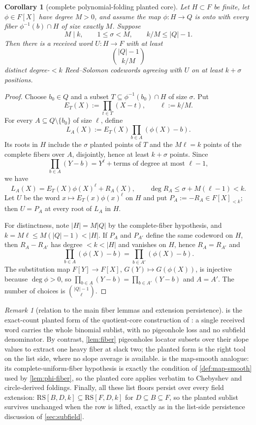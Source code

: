 \documentclass[11pt]{article}
\newtheorem{corollary}[corollary]{Corollary}
\theoremstyle{definition}
\theoremstyle{remark}
\newtheorem{remark}[remark]{Remark}
\newcommand{\RS}{\mathrm{RS}}
\begin{document}
\begin{corollary}[complete polynomial-folding planted core]\label{cor:capf-polyfold-planted}
Let $H\subset F$ be finite, let $\phi\in F[X]$ have degree $M>0$, and assume the map $\phi:H\to Q$ is onto with every fiber $\phi^{-1}(b)\cap H$ of size exactly $M$.  Suppose
\[
        M\mid k,
        \qquad
        1\le\sigma<M,
        \qquad
        k/M\le |Q|-1 .
\]
Then there is a received word $U:H\to F$ with at least
\[
        \binom{|Q|-1}{k/M}
\]
distinct degree-$<k$ Reed--Solomon codewords agreeing with $U$ on at least $k+\sigma$ positions.
\end{corollary}

\begin{proof}
Choose $b_0\in Q$ and a subset $T\subseteq \phi^{-1}(b_0)\cap H$ of size $\sigma$.  Put
\[
        E_T(X):=\prod_{t\in T}(X-t),
        \qquad
        \ell:=k/M.
\]
For every $A\subseteq Q\setminus\{b_0\}$ of size $\ell$, define
\[
        L_A(X):=E_T(X)\prod_{b\in A}(\phi(X)-b).
\]
Its roots in $H$ include the $\sigma$ planted points of $T$ and the $M\ell=k$ points of the complete fibers over $A$, disjointly, hence at least $k+\sigma$ points.  Since
\[
        \prod_{b\in A}(Y-b)=Y^\ell+\text{terms of degree at most }\ell-1,
\]
we have
\[
        L_A(X)=E_T(X)\phi(X)^\ell+R_A(X),
        \qquad
        \deg R_A\le \sigma+M(\ell-1)<k.
\]
Let $U$ be the word $x\mapsto E_T(x)\phi(x)^\ell$ on $H$ and put $P_A:=-R_A\in F[X]_{<k}$; then $U=P_A$ at every root of $L_A$ in $H$.

For distinctness, note $|H|=M|Q|$ by the complete-fiber hypothesis, and $k=M\ell\le M(|Q|-1)<|H|$.  If $P_A$ and $P_{A'}$ define the same codeword on $H$, then $R_A-R_{A'}$ has degree $<k<|H|$ and vanishes on $H$, hence $R_A=R_{A'}$ and
\[
        \prod_{b\in A}(\phi(X)-b)=\prod_{b\in A'}(\phi(X)-b).
\]
The substitution map $F[Y]\to F[X]$, $G(Y)\mapsto G(\phi(X))$, is injective because $\deg\phi>0$, so $\prod_{b\in A}(Y-b)=\prod_{b\in A'}(Y-b)$ and $A=A'$.  The number of choices is $\binom{|Q|-1}{\ell}$.
\end{proof}

\begin{remark}[relation to the main fiber lemmas and extension persistence]\label{rem:capf-planted-main}
 is the exact-count planted form of the quotient-core construction of \cite{Cho26b}: a single received word carries the whole binomial sublist, with no pigeonhole loss and no subfield denominator.  By contrast, \cref{lem:fiber} pigeonholes locator subsets over their slope values to extract one heavy fiber at slack two; the planted form is the right tool on the list side, where no slope average is available.   is the map-smooth analogue: its complete-uniform-fiber hypothesis is exactly the condition of \cref{def:map-smooth} used by \cref{lem:phi-fiber}, so the planted core applies verbatim to Chebyshev and circle-derived foldings.  Finally, all these list floors persist over every field extension: $\RS[B,D,k]\subseteq\RS[F,D,k]$ for $D\subseteq B\subseteq F$, so the planted sublist survives unchanged when the row is lifted, exactly as in the list-side persistence discussion of \cref{sec:subfield}.
\end{remark}
\end{document}
